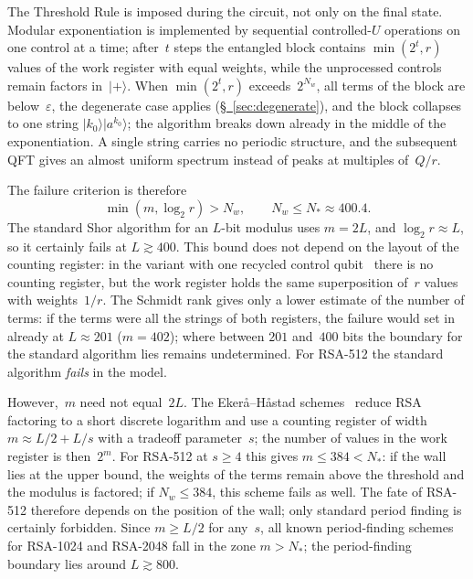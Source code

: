 \documentclass[11pt,a4paper]{article}
\newcommand{\CollapseRule}{Threshold Rule}
\begin{document}
The \CollapseRule{} is imposed during the circuit, not only on the final state. Modular exponentiation is implemented by sequential controlled-$U$ operations on one control at a time; after~$t$ steps the entangled block contains $\min(2^t,r)$ values of the work register with equal weights, while the unprocessed controls remain factors in~$|+\rangle$. When $\min(2^t,r)$ exceeds~$2^{N_w}$, all terms of the block are below~$\varepsilon$, the degenerate case applies (\hyperref[sec:degenerate]{\S~\ref*{sec:degenerate}}), and the block collapses to one string $|k_0\rangle|a^{k_0}\rangle$; the algorithm breaks down already in the middle of the exponentiation. A single string carries no periodic structure, and the subsequent QFT gives an almost uniform spectrum instead of peaks at multiples of~$Q/r$.

The failure criterion is therefore
\begin{equation}
\min(m,\log_2 r)>N_w,\qquad N_w\le N_*\approx400.4.
\end{equation}
The standard Shor algorithm for an $L$-bit modulus uses $m=2L$, and $\log_2 r\approx L$, so it certainly fails at $L\gtrsim400$. This bound does not depend on the layout of the counting register: in the variant with one recycled control qubit~\cite{beauregard2003} there is no counting register, but the work register holds the same superposition of~$r$ values with weights~$1/r$. The Schmidt rank gives only a lower estimate of the number of terms: if the terms were all the strings of both registers, the failure would set in already at $L\approx201$ ($m=402$); where between $201$ and~$400$ bits the boundary for the standard algorithm lies remains undetermined. For RSA-512 the standard algorithm \emph{fails} in the model.

However,~$m$ need not equal~$2L$. The Ekerå--Håstad schemes~\cite{ekera2017} reduce RSA factoring to a short discrete logarithm and use a counting register of width $m\approx L/2+L/s$ with a tradeoff parameter~$s$; the number of values in the work register is then~$2^m$. For RSA-512 at $s\ge4$ this gives $m\le384<N_*$: if the wall lies at the upper bound, the weights of the terms remain above the threshold and the modulus is factored; if $N_w\le384$, this scheme fails as well. The fate of RSA-512 therefore depends on the position of the wall; only standard period finding is certainly forbidden. Since $m\ge L/2$ for any~$s$, all known period-finding schemes for RSA-1024 and RSA-2048 fall in the zone $m>N_*$; the period-finding boundary lies around $L\gtrsim800$.
\end{document}
